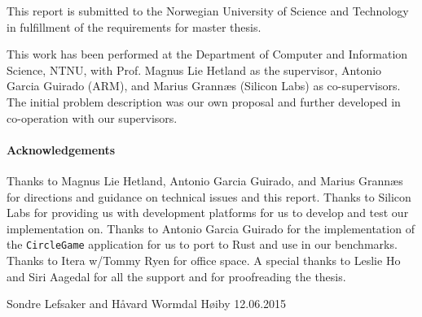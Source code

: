 
\label{chap:preface}

This report is submitted to the Norwegian University of Science and Technology in fulfillment of the requirements for master thesis.

This work has been performed at the Department of Computer and Information Science, NTNU, with Prof. Magnus Lie Hetland as the supervisor, Antonio Garcia Guirado (ARM), and Marius Grannæs (Silicon Labs) as co-supervisors.
The initial problem description was our own proposal and further developed in co-operation with our supervisors.

\paragraph{Acknowledgements} \hfill

Thanks to Magnus Lie Hetland, Antonio Garcia Guirado, and Marius Grannæs for directions and guidance on technical issues and this report.
Thanks to Silicon Labs for providing us with development platforms for us to develop and test our implementation on.
Thanks to Antonio Garcia Guirado for the implementation of the \texttt{CircleGame} application for us to port to Rust and use in our benchmarks.
Thanks to Itera w/Tommy Ryen for office space.
A special thanks to Leslie Ho and Siri Aagedal for all the support and for proofreading the thesis.

\hfill \break

Sondre Lefsaker and Håvard Wormdal Høiby \hfill 12.06.2015
